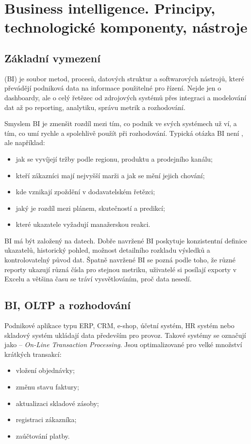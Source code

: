 \section{Business intelligence. Principy, technologické komponenty, nástroje}

\subsection{Základní vymezení}
 (BI) je soubor metod, procesů, datových struktur a softwarových nástrojů, které převádějí podniková data na informace použitelné pro řízení. Nejde jen o dashboardy, ale o celý řetězec od zdrojových systémů přes integraci a modelování dat až po reporting, analytiku, správu metrik a rozhodování.

Smyslem BI je zmenšit rozdíl mezi tím, co podnik ve svých systémech už ví, a tím, co umí rychle a spolehlivě použít při rozhodování. Typická otázka BI není , ale například:
\begin{itemize}
  \item jak se vyvíjejí tržby podle regionu, produktu a prodejního kanálu;
  \item kteří zákazníci mají nejvyšší marži a jak se mění jejich chování;
  \item kde vznikají zpoždění v dodavatelském řetězci;
  \item jaký je rozdíl mezi plánem, skutečností a predikcí;
  \item které ukazatele vyžadují manažerskou reakci.
\end{itemize}

BI má být  založený na datech. Dobře navržené BI poskytuje konzistentní definice ukazatelů, historický pohled, možnost detailního rozkladu výsledků a kontrolovatelný původ dat. Špatně navržené BI se pozná podle toho, že různé reporty ukazují různá čísla pro stejnou metriku, uživatelé si posílají exporty v Excelu a většina času se tráví vysvětlováním, proč data nesedí.

\subsection{BI, OLTP a rozhodování}
Podnikové aplikace typu ERP, CRM, e-shop, účetní systém, HR systém nebo skladový systém ukládají data především pro provoz. Takové systémy se označují jako  -- \textit{On-Line Transaction Processing}. Jsou optimalizované pro velké množství krátkých transakcí:
\begin{itemize}
  \item vložení objednávky;
  \item změnu stavu faktury;
  \item aktualizaci skladové zásoby;
  \item registraci zákazníka;
  \item zaúčtování platby.
\end{itemize}

